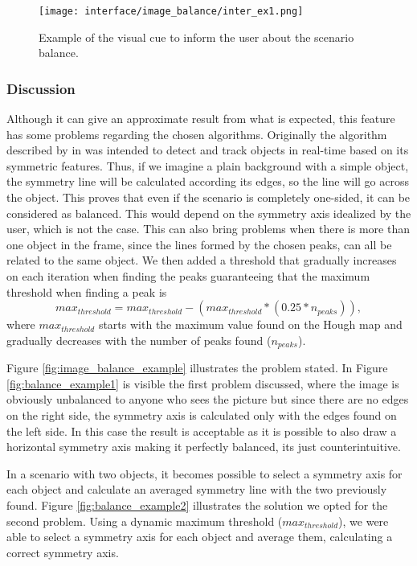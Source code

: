 \begin{figure}[htbp]
	\centering	
	\texttt{[image: interface/image\_balance/inter\_ex1.png]}
    \caption{Example of the visual cue to inform the user about the scenario balance.}
    \label{fig:balance_inter}
\end{figure}

\subsubsection{Discussion}

Although it can give an approximate result from what is expected, this feature has some problems regarding the chosen algorithms. Originally the algorithm described by \citeauthor{li2006real} in \cite{li2006real} was intended to detect and track objects in real-time based on its symmetric features. Thus, if we imagine a plain background with a simple object, the symmetry line will be calculated according its edges, so the line will go across the object. This proves that even if the scenario is completely one-sided, it can be considered as balanced. This would depend on the symmetry axis idealized by the user, which is not the case.
This can also bring problems when there is more than one object in the frame, since the lines formed by the chosen peaks, can all be related to the same object. We then added a threshold that gradually increases on each iteration when finding the peaks guaranteeing that the maximum threshold when finding a peak is 
\begin{equation}
	max_{threshold} = max_{threshold} - (max_{threshold}*(0.25*n_{peaks})),
\end{equation}
where $max_{threshold}$ starts with the maximum value found on the Hough map and gradually decreases with the number of peaks found ($n_{peaks}$).

Figure \ref{fig:image_balance_example} illustrates the problem stated. In Figure \ref{fig:balance_example1} is visible the first problem discussed, where the image is obviously unbalanced to anyone who sees the picture but since there are no edges on the right side, the symmetry axis is calculated only with the edges found on the left side. In this case the result is acceptable as it is possible to also draw a horizontal symmetry axis making it perfectly balanced, its just counterintuitive. 

In a scenario with two objects, it becomes possible to select a symmetry axis for each object and calculate an averaged symmetry line with the two previously found. Figure \ref{fig:balance_example2} illustrates the solution we opted for the second problem. Using a dynamic maximum threshold ($max_{threshold}$), we were able to select a symmetry axis for each object and average them, calculating a correct symmetry axis.

